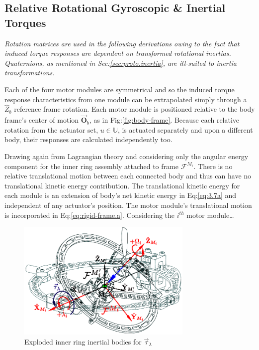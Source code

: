 \subsection{Relative Rotational Gyroscopic \& Inertial Torques}
\label{subsec:dynamics.nonlinearities.gyrotorques}
\emph{\color{gray}Rotation matrices are used in the following derivations owing to the fact that induced torque responses are dependent on transformed rotational inertias. Quaternions, as mentioned in Sec:\ref{sec:proto.inertia}, are ill-suited to inertia transformations.}
\par
Each of the four motor modules are symmetrical and so the induced torque response characteristics from one module can be extrapolated simply through a $\hat{Z}_b$ reference frame rotation. Each motor module is positioned relative to the body frame's center of motion $\vec{\mathbf{O}}_b$, as in Fig:\ref{fig:body-frame}. Because each relative rotation from the actuator set, $u\in\mathbb{U}$, is actuated separately and upon a different body, their responses are calculated independently too.
\par
Drawing again from Lagrangian theory and considering only the angular energy component for the inner ring assembly attached to frame $\mathcal{F}^{M_i}$. There is no relative translational motion between each connected body and thus can have no translational kinetic energy contribution. The translational kinetic energy for each module is an extension of body's net kinetic energy in Eq:\ref{eq:3.7a} and independent of any actuator's position. The motor module's translational motion is incorporated in Eq:\ref{eq:rigid-frame.a}. Considering the $i^{th}$ motor module\ldots
\begin{figure}[htbp]
\centering
\includegraphics[width=0.75\textwidth]{figs/response-inner}
\caption{Exploded inner ring inertial bodies for $\vec{\tau}_\lambda$}
\label{fig:response-inner}
\vspace{-12pt}
\end{figure}

